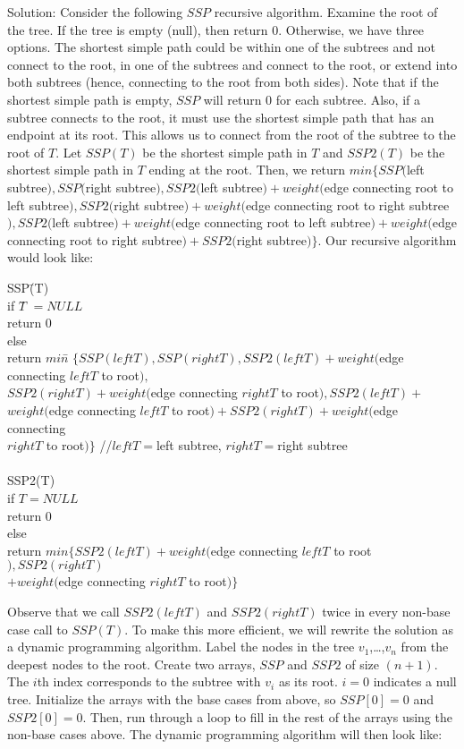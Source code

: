 \documentclass{article}
\begin{document}
\begin{enumerate}
\newline Solution: Consider the following $SSP$ recursive algorithm. Examine the root of the tree. If the tree is empty (null), then return 0. Otherwise, we have three options. The shortest simple path could be within one of the subtrees and not connect to the root, in one of the subtrees and connect to the root, or extend into both subtrees (hence, connecting to the root from both sides). Note that if the shortest simple path is empty, $SSP$ will return 0 for each subtree. Also, if a subtree connects to the root, it must use the shortest simple path that has an endpoint at its root. This allows us to connect from the root of the subtree to the root of $T$. Let $SSP(T)$ be the shortest simple path in $T$ and $SSP2(T)$ be the shortest simple path in $T$ ending at the root. Then, we return $min\{SSP($left subtree$), SSP($right subtree$), SSP2($left subtree$)+weight($edge connecting root to left subtree$), SSP2($right subtree$)+weight($edge connecting root to right subtree$), SSP2($left subtree$)+ weight($edge connecting root to left subtree$)+weight($edge connecting root to right subtree$)+SSP2($right subtree$)\}$. Our recursive algorithm would look like:
\begin{tabbing}
SSP\= (T)\\
\>if $T $\= $= NULL$\\
\>\>return 0\\
\>else\\
\>\>return $min$\= $\{SSP(leftT),SSP(rightT),SSP2(leftT)+weight($edge connecting $leftT$ to root$),$\\
\>\>\>$SSP2(rightT)+weight($edge connecting $rightT$ to root$),SSP2(leftT)+$\\
\>\>\>$weight($edge connecting $leftT$ to root$)+SSP2(rightT)+weight($edge connecting\\
\>\>\> $rightT$ to root$)\}$ //$leftT=$left subtree, $rightT=$right subtree\\
\\
SSP2(T)\\
\>if $T=NULL$\\
\>\>return 0\\
\>else\\
\>\>return $min\{SSP2(leftT)+weight($edge connecting $leftT$ to root$),SSP2(rightT)$\\
\>\>\>$+weight($edge connecting $rightT$ to root$)\}$
\end{tabbing}
Observe that we call $SSP2(leftT)$ and $SSP2(rightT)$ twice in every non-base case call to $SSP(T)$. To make this more efficient, we will rewrite the solution as a dynamic programming algorithm. Label the nodes in the tree $v_1$,\ldots ,$v_n$ from the deepest nodes to the root. Create two arrays, $SSP$ and $SSP2$ of size $(n+1)$. The $i$th index corresponds to the subtree with $v_i$ as its root. $i=0$ indicates a null tree. Initialize the arrays with the base cases from above, so $SSP[0]=0$ and $SSP2[0]=0$. Then, run through a loop to fill in the rest of the arrays using the non-base cases above. The dynamic programming algorithm will then look like:

\end{enumerate}
\end{document}
